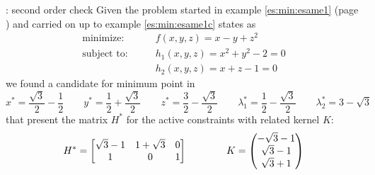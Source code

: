 	\begin{example}{: second order check}
		Given the problem started in example \ref{es:min:esame1} (page \pageref{es:min:esame1}) and carried on up to example \ref{es:min:esame1c} states as
		\begin{align*}
			\textrm{minimize:} \qquad & f(x,y,z) = x - y + z^2 \\
			\textrm{subject to:} \qquad & h_1(x,y,z) = x^2 + y^2 - 2 = 0 \\
			& h_2(x,y,z) = x+z-1 = 0
		\end{align*}
		we found a candidate for minimum point in
		\[ x^* = \frac{\sqrt 3}{2} - \frac 1 2 \qquad y^* = \frac 1 2 + \frac{\sqrt 3} 2 \qquad z^* = \frac 3 2 - \frac{\sqrt 3}{2} \qquad \lambda_1^* = \frac 1 2 - \frac{\sqrt3}{2} \qquad \lambda_2^* = 3-\sqrt 3 \]
		that present the matrix $H^*$ for the active constraints with related kernel $K$:
		\[ H^*= \begin{bmatrix}
			\sqrt 3 - 1 & 1 + \sqrt 3 & 0 \\ 1 & 0 & 1
		\end{bmatrix} \qquad \qquad K = \begin{pmatrix} -\sqrt 3 - 1 \\ \sqrt 3 - 1 \\ \sqrt 3 + 1 \end{pmatrix} \]
		

\end{example}
